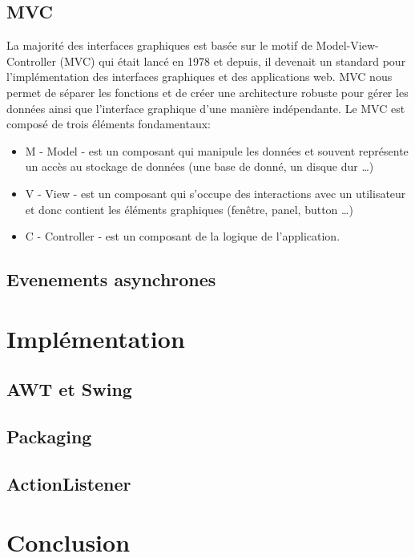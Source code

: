 \documentclass[10pt]{article}
\begin{document}
\subsection{MVC}
La majorité des interfaces graphiques est basée sur le motif de Model-View-Controller (MVC) qui était lancé en 1978 et depuis, il devenait un standard pour l'implémentation des interfaces graphiques et des applications web. MVC nous permet de séparer les fonctions et de créer une architecture robuste pour gérer les données ainsi que l’interface graphique d’une manière indépendante. Le MVC est composé de trois éléments fondamentaux:
\begin{itemize}
    \item M - Model - est un composant qui manipule les données et souvent représente un accès au stockage de données (une base de donné, un disque dur …)
    \item V - View - est un composant qui s’occupe des interactions avec un utilisateur et donc contient les éléments graphiques (fenêtre, panel, button …)
    \item C - Controller - est un composant de la logique de l’application.
\end{itemize}

\subsection{Evenements asynchrones}

\section{Implémentation}
\subsection{AWT et Swing}
\subsection{Packaging}
\subsection{ActionListener}


\section{Conclusion}
\end{document}
